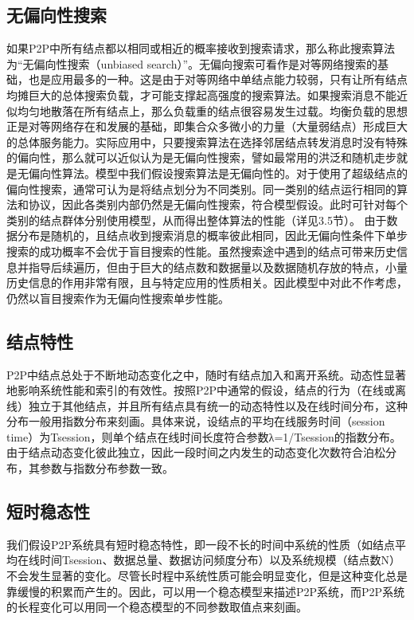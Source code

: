 \subsection{无偏向性搜索}

如果P2P中所有结点都以相同或相近的概率接收到搜索请求，那么称此搜索算法为“无偏向性搜索（unbiased search）”。无偏向搜索可看作是对等网络搜索的基础，也是应用最多的一种。这是由于对等网络中单结点能力较弱，只有让所有结点均摊巨大的总体搜索负载，才可能支撑起高强度的搜索算法。如果搜索消息不能近似均匀地散落在所有结点上，那么负载重的结点很容易发生过载。均衡负载的思想正是对等网络存在和发展的基础，即集合众多微小的力量（大量弱结点）形成巨大的总体服务能力。实际应用中，只要搜索算法在选择邻居结点转发消息时没有特殊的偏向性，那么就可以近似认为是无偏向性搜索，譬如最常用的洪泛和随机走步就是无偏向性算法。模型中我们假设搜索算法是无偏向性的。对于使用了超级结点的偏向性搜索，通常可认为是将结点划分为不同类别。同一类别的结点运行相同的算法和协议，因此各类别内部仍然是无偏向性搜索，符合模型假设。此时可针对每个类别的结点群体分别使用模型，从而得出整体算法的性能（详见3.5节）。
由于数据分布是随机的，且结点收到搜索消息的概率彼此相同，因此无偏向性条件下单步搜索的成功概率不会优于盲目搜索的性能。虽然搜索途中遇到的结点可带来历史信息并指导后续遍历，但由于巨大的结点数和数据量以及数据随机存放的特点，小量历史信息的作用非常有限，且与特定应用的性质相关。因此模型中对此不作考虑，仍然以盲目搜索作为无偏向性搜索单步性能。


\subsection{结点特性}

P2P中结点总处于不断地动态变化之中，随时有结点加入和离开系统。动态性显著地影响系统性能和索引的有效性。按照P2P中通常的假设，结点的行为（在线或离线）独立于其他结点，并且所有结点具有统一的动态特性以及在线时间分布，这种分布一般用指数分布来刻画。具体来说，设结点的平均在线服务时间（session time）为Tsession，则单个结点在线时间长度符合参数λ=1/Tsession的指数分布。由于结点动态变化彼此独立，因此一段时间之内发生的动态变化次数符合泊松分布，其参数与指数分布参数一致。


\subsection{短时稳态性}

我们假设P2P系统具有短时稳态特性，即一段不长的时间中系统的性质（如结点平均在线时间Tsession、数据总量、数据访问频度分布）以及系统规模（结点数N）不会发生显著的变化。尽管长时程中系统性质可能会明显变化，但是这种变化总是靠缓慢的积累而产生的。因此，可以用一个稳态模型来描述P2P系统，而P2P系统的长程变化可以用同一个稳态模型的不同参数取值点来刻画。

